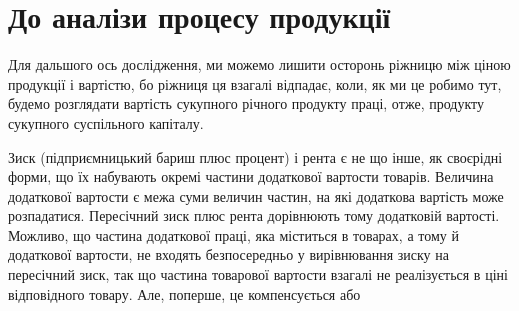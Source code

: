 \section{До аналізи процесу продукції}

Для дальшого ось дослідження, ми можемо лишити осторонь ріжницю між
ціною продукції і вартістю, бо ріжниця ця взагалі відпадає, коли, як ми це
робимо тут, будемо розглядати вартість сукупного річного продукту праці, отже,
продукту сукупного суспільного капіталу.

Зиск (підприємницький бариш плюс процент) і рента є не що інше, як
своєрідні форми, що їх набувають окремі частини додаткової вартости товарів.
Величина додаткової вартости є межа суми величин частин, на які додаткова
вартість може розпадатися. Пересічний зиск плюс рента дорівнюють
тому додатковій вартості. Можливо, що частина додаткової праці, яка міститься
в товарах, а тому й додаткової вартости, не входять безпосередньо у вирівнювання
зиску на пересічний зиск, так що частина товарової вартости взагалі не
реалізується в ціні відповідного товару. Але, поперше, це компенсується або
\parbreak{}  %
